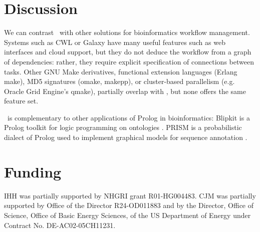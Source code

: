 \section*{Discussion}

We can contrast \biomake\ with other solutions for bioinformatics workflow management.
Systems such as CWL or Galaxy have many useful features such as web interfaces and cloud support,
but they do not deduce the workflow from a graph of dependencies: rather, they require explicit specification of connections between tasks.
Other GNU Make derivatives,
functional extension languages (Erlang make),
MD5 signatures (omake, makepp),
or cluster-based parallelism (e.g. Oracle Grid Engine's qmake),
partially overlap with \biomake, but none offers the same feature set.

\biomake\ is complementary to other applications of Prolog in bioinformatics:
Blipkit is a Prolog toolkit for logic programming on ontologies \citep{Blipkit2009}.
PRISM is a probabilistic dialect of Prolog used to implement graphical models for sequence annotation \citep{MorkHolmes2012,HaveMork2014}.


%

\section*{Funding}

IHH was partially supported by NHGRI grant R01-HG004483. CJM was partially supported by Office of the Director R24-OD011883 and by the
Director, Office of Science, Office of Basic Energy Sciences, of the
US Department of Energy under Contract No. DE-AC02-05CH11231.


%
%
%
%
%
%
%
%



